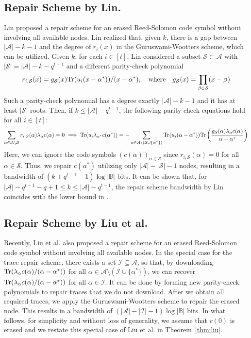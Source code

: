 \documentclass[onecolumn]{IEEEtran}
\theoremstyle{plain}
\theoremstyle{definition}
\newcommand{\BB}{\mathbb{B}}
\newcommand{\cS}{\mathcal{S}}
\newcommand{\cA}{\mathcal{A}}
\newcommand{\cI}{\mathcal{I}}
\newcommand{\tr}{{\rm Tr}}
\begin{document}
{\color{black}
\subsection{Repair Scheme by Lin.}
Lin \cite{Lin2023} proposed a repair scheme for an erased Reed-Solomon code symbol without involving all available nodes. Lin realized that, given $k$, there is a gap between $|\cA|-k-1$ and the degree of $r_i(x)$ in the Guruswami-Wootters scheme, which can be utilized. Given $k$, for each $i\in[t]$, Lin considered a subset $\cS\subset \cA$ with $|\cS| = |\cA| - k - q^{t-1}$ and a different parity-check polynomial
$$
r_{i,\cS}(x) = g_{\cS}(x)\tr(u_i(x-\alpha^*))/(x-\alpha^*),\quad\text{where}\quad g_{\cS}(x) = \prod_{\beta\in \cS }(x-\beta) 
$$
Such a parity-check polynomial has a degree exactly $|\cA|-k-1$ and it has at least $|\cS|$ roots. Then, if $k\le |\cA|-q^{t-1}$, the following parity check equations hold for all $i\in[t]$:
\begin{align*}
    \sum_{\alpha\in\cA\setminus\cS} r_{i,\cS}(\alpha)\lambda_{\alpha}c(\alpha) = 0 \implies \tr(u_i\lambda_{\alpha^*}c(\alpha^*)) = -\sum_{\alpha\in\cA\setminus(\cS\cup \{\alpha^*\})} \tr(u_i(\alpha-\alpha^*))\tr\left(\frac{g_{\cS}(\alpha)\lambda_\alpha c(\alpha)}{\alpha-\alpha^*}\right)
\end{align*}
Here, we can ignore the code symbols $(c(\alpha))_{\alpha\in\cS}$ since $r_{i,\cS}(\alpha) = 0$ for all $\alpha\in\cS$. Thus, we repair $c(\alpha^*)$ utilizing only $|\cA|-|\cS|-1$ nodes, resulting in a bandwidth of $(k+q^{t-1}-1)\log|\BB|$ bits. It can be shown that, for $|\cA|-q^{t-1}-q+1\le k \le |\cA|-q^{t-1}$, the repair scheme bandwidth by Lin \cite{Lin2023} coincides with the lower bound in \cite{Dau2017}. 
}

\subsection{Repair Scheme by Liu et al.}
Recently, Liu et al. \cite{Liu2024} also proposed a repair scheme for an erased Reed-Solomon code symbol without involving all available nodes. In the special case for the trace repair scheme,
there exists a set $\cI \subseteq \cA$, so that, by downloading $\tr(\lambda_\alpha c(\alpha)/(\alpha-\alpha^*))$ for all $\alpha\in\cA\setminus(\cI\cup\{\alpha^*\} )$, we can recover $\tr(\lambda_\alpha c(\alpha)/(\alpha-\alpha^*))$ for all $\alpha\in \cI$. It can be done by forming new parity-check polynomials to repair traces that we do not download. After we obtain all required traces, we apply the Guruswami-Wootters scheme to repair the erased node. This results in a bandwidth of $(|\cA|-|\cI|-1)\log|\BB|$ bits. In what follows, for simplicity and without loss of generality, we assume that $c(0)$ is erased and we restate this special case of Liu et al. \cite{Liu2024} in Theorem~\ref{thm:liu}.
\end{document}

